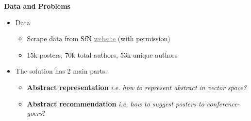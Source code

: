\begin{frame}{\textbf{Data and Problems}}

\begin{itemize}

\item Data
\begin{itemize}
\item Scrape data from SfN \href{http://www.abstractsonline.com/plan/BrowseResults.aspx?date=11/15/2014&mkey=\%7B54C85D94-6D69-4B09-AFAA-502C0E680CA7\%7D}{\textcolor{gray}{website}} (with permission)
\item 15k posters, 70k total authors, 53k unique authors
\end{itemize}


\item The solution has 2 main parts:
\begin{itemize}
\item \textbf{Abstract representation} \textit{i.e. how to represent abstract in vector space?}
\item \textbf{Abstract recommendation} \textit{i.e. how to suggest posters to conference-goers}?
\end{itemize}

\end{itemize}

\end{frame}
